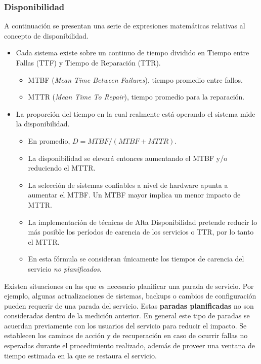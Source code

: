 \subsubsection*{Disponibilidad}
A continuación se presentan una serie de expresiones matemáticas relativas al 
concepto de disponibilidad. 

\begin{itemize}	

	\item Cada sistema existe sobre un continuo de tiempo dividido en Tiempo entre Fallas (TTF) y Tiempo de Reparación (TTR). 
	\begin{itemize}
		\item MTBF (\textit{Mean Time Between Failures}), tiempo promedio entre fallos.
		\item MTTR (\textit{Mean Time To Repair}), tiempo promedio para la reparación.
	\end{itemize}
	\item La proporción del tiempo en la cual realmente está operando el sistema mide la disponibilidad. 
	\begin{itemize}
		\item En promedio, $D = MTBF / (MTBF + MTTR)$.
		\item La disponibilidad se elevará entonces aumentando el MTBF y/o reduciendo el MTTR. 
		\item La selección de sistemas confiables a nivel de hardware apunta a aumentar el MTBF. Un MTBF mayor implica un menor impacto de MTTR. 
		\item La implementación de técnicas de Alta Disponibilidad pretende reducir lo más posible los períodos de carencia de los servicios o TTR, por lo tanto el MTTR. 
		\item En esta fórmula se consideran únicamente los tiempos de carencia del servicio \textit{no planificados}.
	\end{itemize}
	\end{itemize}

Existen situaciones en las que es necesario planificar una parada de servicio. Por ejemplo, algunas actualizaciones de sistemas, backups o cambios de configuración pueden requerir de una parada del servicio. Estas {\bf paradas planificadas} no son consideradas dentro de la medición anterior. En general este tipo de 
paradas se acuerdan previamente con los usuarios del servicio para reducir 
el impacto. Se establecen los caminos de acción y de recuperación en caso de
ocurrir fallas no esperadas durante el procedimiento realizado, además de 
proveer una ventana de tiempo estimada en la que se restaura el servicio. 

